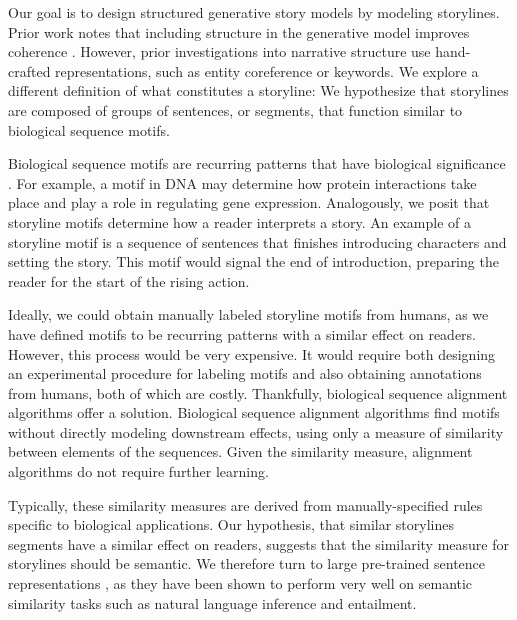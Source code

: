 \documentclass{article}
\begin{document}
Our goal is to design structured generative story models by modeling storylines.
Prior work notes that including structure in the generative model improves coherence
\citep{yao2018storyline,fan2019structure,ippolito2019rarewords,chandu2020narrative,rakshin2020plotmachines}.
However, prior investigations into narrative structure use hand-crafted representations,
such as entity coreference or keywords.
We explore a different definition of what constitutes a storyline:
We hypothesize that storylines are composed of groups of sentences, or segments, that function
similar to biological sequence motifs.

Biological sequence motifs are recurring patterns that have
biological significance \citep{biomotif}.
For example, a motif in DNA may determine how protein interactions take place
and play a role in regulating gene expression.
Analogously, we posit that storyline motifs determine how a reader interprets a story.
An example of a storyline motif is a sequence of sentences that finishes 
introducing characters and setting the story.
This motif would signal the end of introduction, preparing the reader for 
the start of the rising action.

Ideally, we could obtain manually labeled storyline motifs from humans,
as we have defined motifs to be recurring patterns with a similar effect on readers.
However, this process would be very expensive.
It would require both designing an experimental procedure for labeling motifs
and also obtaining annotations from humans, both of which are costly.
Thankfully, biological sequence alignment algorithms offer a solution.
Biological sequence alignment algorithms find motifs without directly modeling
downstream effects, using only a measure of similarity between elements of the sequences.
Given the similarity measure, alignment algorithms do not require further learning.

Typically, these similarity measures are derived from manually-specified rules specific
to biological applications.
Our hypothesis, that similar storylines segments have a similar effect on readers,
suggests that the similarity measure for storylines should be semantic.
We therefore turn to large pre-trained sentence representations \citep{reimers2019sbert},
as they have been shown to perform very well on semantic similarity tasks such as natural language 
inference and entailment.
\end{document}
